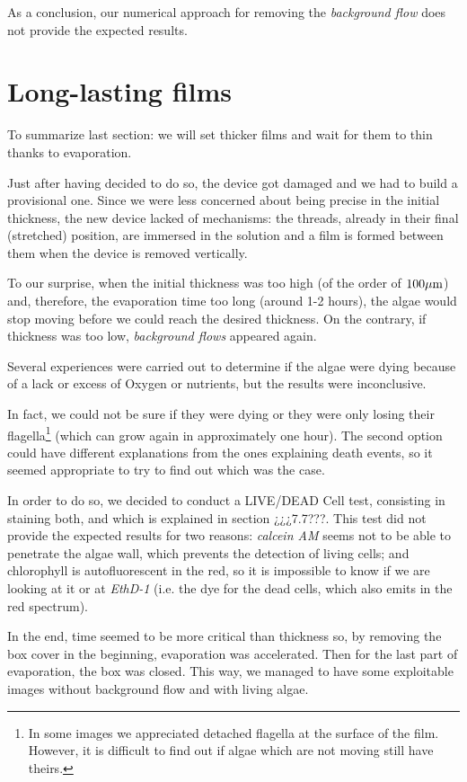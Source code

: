 As a conclusion, our numerical approach for removing the \textit{background flow} does not provide the expected results.

\section{Long-lasting films}

To summarize last section: we will set thicker films and wait for them to thin thanks to evaporation.

Just after having decided to do so, the device got damaged and we had to build a provisional one. Since we were less concerned about being precise in the initial thickness, the new device lacked of mechanisms: the threads, already in their final (stretched) position, are immersed in the solution and a film is formed between them when the device is removed vertically.

To our surprise, when the initial thickness was too high (of the order of $100 \mu \textrm m$) and, therefore, the evaporation time too long (around 1-2 hours), the algae would stop moving before we could reach the desired thickness. On the contrary, if thickness was too low, \textit{background flows} appeared again.

Several experiences were carried out to determine if the algae were dying because of a lack or excess of Oxygen or nutrients, but the results were inconclusive. 

In fact, we could not be sure if they were dying or they were only losing their flagella\footnote{In some images we appreciated detached flagella at the surface of the film. However, it is difficult to find out if algae which are not moving still have theirs.} (which can grow again in approximately one hour). The second option could have different explanations from the ones explaining death events, so it seemed appropriate to try to find out which was the case.

In order to do so, we decided to conduct a LIVE/DEAD Cell test, consisting in staining both, and which is explained in section ¿¿¿7.7???. This test did not provide the expected results for two reasons: \textit{calcein AM} seems not to be able to penetrate the algae wall, which prevents the detection of living cells; and chlorophyll is autofluorescent in the red, so it is impossible to know if we are looking at it or at \textit{EthD-1} (i.e. the dye for the dead cells, which also emits in the red spectrum).

In the end, time seemed to be more critical than thickness so, by removing the box cover in the beginning, evaporation was accelerated. Then for the last part of evaporation, the box was closed. This way, we managed to have some exploitable images without background flow and with living algae.

